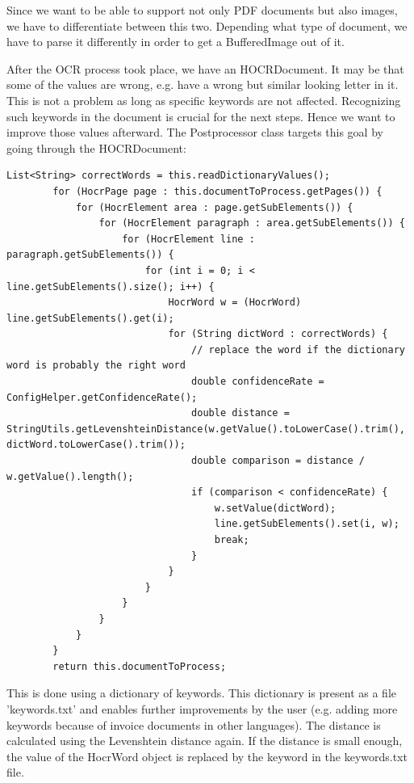 Since we want to be able to support not only PDF documents but also images, we have to differentiate between this two. Depending what type of document, we have to parse it differently in order to get a BufferedImage out of it.

After the OCR process took place, we have an HOCRDocument. It may be that some of the values are wrong, e.g. have a wrong but similar looking letter in it. This is not a problem as long as specific keywords are not affected. Recognizing such keywords in the document is crucial for the next steps. Hence we want to improve those values afterward. 
The Postprocessor class targets this goal by going through the HOCRDocument:

\begin{lstlisting}[caption={Postprocessing the hocr document}]
        List<String> correctWords = this.readDictionaryValues();
        for (HocrPage page : this.documentToProcess.getPages()) {
            for (HocrElement area : page.getSubElements()) {
                for (HocrElement paragraph : area.getSubElements()) {
                    for (HocrElement line : paragraph.getSubElements()) {
                        for (int i = 0; i < line.getSubElements().size(); i++) {
                            HocrWord w = (HocrWord) line.getSubElements().get(i);
                            for (String dictWord : correctWords) {
                                // replace the word if the dictionary word is probably the right word
                                double confidenceRate = ConfigHelper.getConfidenceRate();
                                double distance = StringUtils.getLevenshteinDistance(w.getValue().toLowerCase().trim(), dictWord.toLowerCase().trim());
                                double comparison = distance / w.getValue().length();
                                if (comparison < confidenceRate) {
                                    w.setValue(dictWord);
                                    line.getSubElements().set(i, w);
                                    break;
                                }
                            }
                        }
                    }
                }
            }
        }
        return this.documentToProcess;
\end{lstlisting}

This is done using a dictionary of keywords. This dictionary is present as a file 'keywords.txt' and enables further improvements by the user (e.g. adding more keywords because of invoice documents in other languages).
The distance is calculated using the Levenshtein distance again. If the distance is small enough, the value of the HocrWord object is replaced by the keyword in the keywords.txt file.

